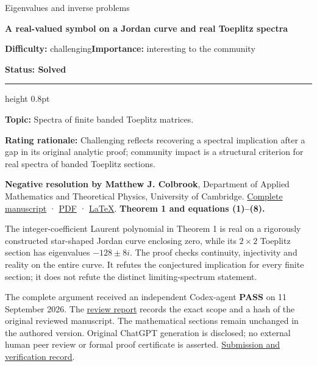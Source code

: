 \documentclass[11pt,a4paper]{article}
\makeatletter
\renewcommand{\subsection}{\Needspace{4\baselineskip}\@startsection{subsection}{2}{0pt}{9pt plus 1pt minus 1pt}{3pt}{\sffamily\bfseries\normalsize\color{ink}}}
\makeatother
\begin{document}
{\sffamily\small\color{muted}Eigenvalues and inverse problems\par}
\vspace{3pt}
{\raggedright{}\sffamily\bfseries\fontsize{21}{24}\selectfont\color{ink}A
real-valued symbol on a Jordan curve and real Toeplitz spectra\par}
\vspace{7pt}
{\sffamily\small\textbf{Difficulty:} challenging\quad\textbf{Importance:} interesting
to the community\par}
{\sffamily\small\bfseries\color{accent}Status: Solved\par}
\vspace{4pt}
{\color{accent}\hrule height 0.8pt}
\vspace{6pt}
\textbf{Topic:} Spectra of finite banded Toeplitz matrices.

\textbf{Rating rationale:} Challenging reflects recovering a spectral
implication after a gap in its original analytic proof; community impact
is a structural criterion for real spectra of banded Toeplitz sections.

\subsection{Resolution --- 2026-09-11}\label{resolution-2026-09-11}

\textbf{Negative resolution by Matthew J. Colbrook}, Department of
Applied Mathematics and Theoretical Physics, University of Cambridge.
\href{https://github.com/ajt60gaibb/OpenProblemsInNLA/blob/main/eigenvalues-and-inverse-problems/SP-06/solution.md}{Complete
manuscript} ·
\href{https://github.com/ajt60gaibb/OpenProblemsInNLA/blob/main/eigenvalues-and-inverse-problems/SP-06/solution.pdf}{PDF}
·
\href{https://github.com/ajt60gaibb/OpenProblemsInNLA/blob/main/eigenvalues-and-inverse-problems/SP-06/solution.tex}{LaTeX}.
\textbf{Theorem 1 and equations (1)--(8).}

The integer-coefficient Laurent polynomial in Theorem 1 is real on a
rigorously constructed star-shaped Jordan curve enclosing zero, while
its \(2\times2\) Toeplitz section has eigenvalues \(-128\pm8i\). The
proof checks continuity, injectivity and reality on the entire curve. It
refutes the conjectured implication for every finite section; it does
not refute the distinct limiting-spectrum statement.

The complete argument received an independent Codex-agent \textbf{PASS}
on 11 September 2026. The
\href{https://github.com/ajt60gaibb/OpenProblemsInNLA/blob/main/references/colbrook-additional-2026-09-11/verification/reviews/SP-06-review.md}{review
report} records the exact scope and a hash of the original reviewed
manuscript. The mathematical sections remain unchanged in the authored
version. Original ChatGPT generation is disclosed; no external human
peer review or formal proof certificate is asserted.
\href{https://github.com/ajt60gaibb/OpenProblemsInNLA/blob/main/references/colbrook-additional-2026-09-11/README.md}{Submission
and verification record}.
\end{document}
